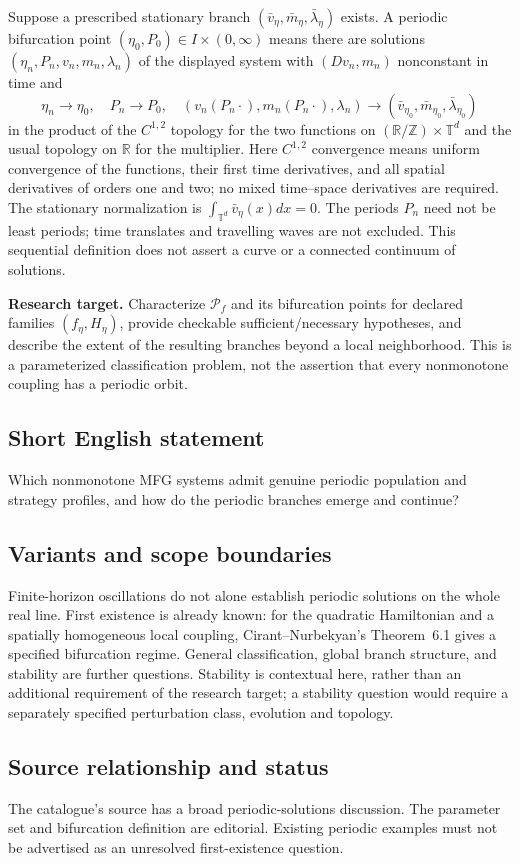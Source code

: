 \documentclass[11pt,a4paper]{article}
\begin{document}
Suppose a prescribed stationary branch $(\bar v_\eta,\bar m_\eta,\bar\lambda_\eta)$ exists. A periodic bifurcation point $(\eta_0,P_0)\in I\times(0,\infty)$ means there are solutions $(\eta_n,P_n,v_n,m_n,\lambda_n)$ of the displayed system with $(Dv_n,m_n)$ nonconstant in time and
\[
 \eta_n\to\eta_0,\quad P_n\to P_0,\quad
 (v_n(P_n\cdot),m_n(P_n\cdot),\lambda_n)
 \to(\bar v_{\eta_0},\bar m_{\eta_0},\bar\lambda_{\eta_0})
\]
in the product of the $C^{1,2}$ topology for the two functions on $(\mathbb R/\mathbb Z)\times\mathbb T^d$ and the usual topology on $\mathbb R$ for the multiplier. Here $C^{1,2}$ convergence means uniform convergence of the functions, their first time derivatives, and all spatial derivatives of orders one and two; no mixed time--space derivatives are required. The stationary normalization is $\int_{\mathbb T^d}\bar v_\eta(x)dx=0$. The periods $P_n$ need not be least periods; time translates and travelling waves are not excluded. This sequential definition does not assert a curve or a connected continuum of solutions.

\textbf{Research target.} Characterize $\mathcal P_f$ and its bifurcation points for declared families $(f_\eta,H_\eta)$, provide checkable sufficient/necessary hypotheses, and describe the extent of the resulting branches beyond a local neighborhood. This is a parameterized classification problem, not the assertion that every nonmonotone coupling has a periodic orbit.
\subsection*{Short English statement}
Which nonmonotone MFG systems admit genuine periodic population and strategy profiles, and how do the periodic branches emerge and continue?
\subsection*{Variants and scope boundaries}
Finite-horizon oscillations do not alone establish periodic solutions on the whole real line. First existence is already known: for the quadratic Hamiltonian and a spatially homogeneous local coupling, Cirant--Nurbekyan's Theorem~6.1 gives a specified bifurcation regime. General classification, global branch structure, and stability are further questions. Stability is contextual here, rather than an additional requirement of the research target; a stability question would require a separately specified perturbation class, evolution and topology.
\subsection*{Source relationship and status}
The catalogue's source has a broad periodic-solutions discussion. The parameter set and bifurcation definition are editorial. Existing periodic examples must not be advertised as an unresolved first-existence question.
\end{document}
